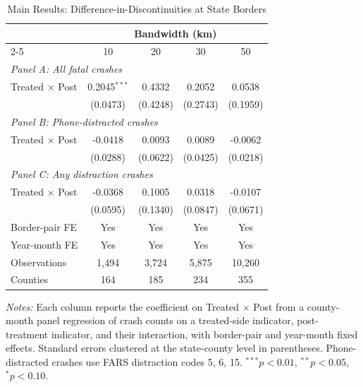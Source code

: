 \begin{table}[htbp]
\centering
\caption{Main Results: Difference-in-Discontinuities at State Borders}
\label{tab:main}
\begin{tabular}{lcccc}
\hline\hline
 & \multicolumn{4}{c}{Bandwidth (km)} \\
 \cmidrule(lr){2-5}
 & 10 & 20 & 30 & 50 \\
\hline
\multicolumn{5}{l}{\textit{Panel A: All fatal crashes}} \\
Treated $\times$ Post & 0.2045$^{***}$ & 0.4332 & 0.2052 & 0.0538 \\
 & (0.0473) & (0.4248) & (0.2743) & (0.1959) \\
[6pt]
\multicolumn{5}{l}{\textit{Panel B: Phone-distracted crashes}} \\
Treated $\times$ Post & -0.0418 & 0.0093 & 0.0089 & -0.0062 \\
 & (0.0288) & (0.0622) & (0.0425) & (0.0218) \\
[6pt]
\multicolumn{5}{l}{\textit{Panel C: Any distraction crashes}} \\
Treated $\times$ Post & -0.0368 & 0.1005 & 0.0318 & -0.0107 \\
 & (0.0595) & (0.1340) & (0.0847) & (0.0671) \\
\hline
Border-pair FE & Yes & Yes & Yes & Yes \\
Year-month FE & Yes & Yes & Yes & Yes \\
Observations & 1,494 & 3,724 & 5,875 & 10,260 \\
Counties & 164 & 185 & 234 & 355 \\
\hline\hline
\end{tabular}
\begin{tablenotes}
\item \textit{Notes:} Each column reports the coefficient on Treated $\times$ Post from a county-month panel regression of crash counts on a treated-side indicator, post-treatment indicator, and their interaction, with border-pair and year-month fixed effects. Standard errors clustered at the state-county level in parentheses. Phone-distracted crashes use FARS distraction codes 5, 6, 15. $^{***}p<0.01$, $^{**}p<0.05$, $^{*}p<0.10$.
\end{tablenotes}
\end{table}

